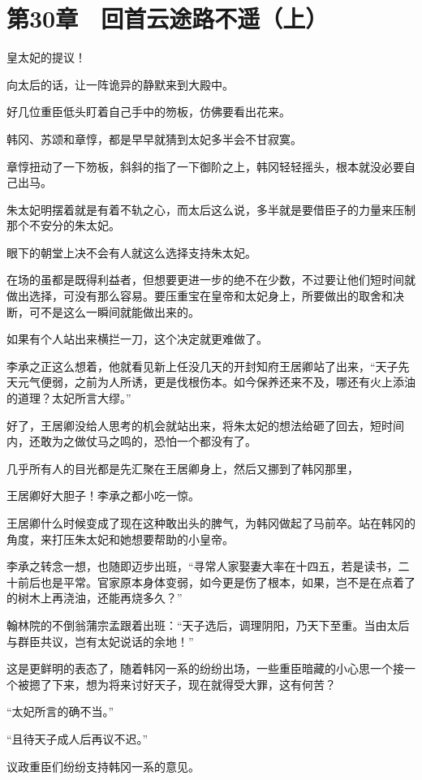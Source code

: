 \section{第30章　回首云途路不遥（上）}

皇太妃的提议！

向太后的话，让一阵诡异的静默来到大殿中。

好几位重臣低头盯着自己手中的笏板，仿佛要看出花来。

韩冈、苏颂和章惇，都是早早就猜到太妃多半会不甘寂寞。

章惇扭动了一下笏板，斜斜的指了一下御阶之上，韩冈轻轻摇头，根本就没必要自己出马。

朱太妃明摆着就是有着不轨之心，而太后这么说，多半就是要借臣子的力量来压制那个不安分的朱太妃。

眼下的朝堂上决不会有人就这么选择支持朱太妃。

在场的虽都是既得利益者，但想要更进一步的绝不在少数，不过要让他们短时间就做出选择，可没有那么容易。要压重宝在皇帝和太妃身上，所要做出的取舍和决断，可不是这么一瞬间就能做出来的。

如果有个人站出来横拦一刀，这个决定就更难做了。

李承之正这么想着，他就看见新上任没几天的开封知府王居卿站了出来，“天子先天元气便弱，之前为人所诱，更是伐根伤本。如今保养还来不及，哪还有火上添油的道理？太妃所言大缪。”

好了，王居卿没给人思考的机会就站出来，将朱太妃的想法给砸了回去，短时间内，还敢为之做仗马之鸣的，恐怕一个都没有了。

几乎所有人的目光都是先汇聚在王居卿身上，然后又挪到了韩冈那里，

王居卿好大胆子！李承之都小吃一惊。

王居卿什么时候变成了现在这种敢出头的脾气，为韩冈做起了马前卒。站在韩冈的角度，来打压朱太妃和她想要帮助的小皇帝。

李承之转念一想，也随即迈步出班，“寻常人家娶妻大率在十四五，若是读书，二十前后也是平常。官家原本身体变弱，如今更是伤了根本，如果，岂不是在点着了的树木上再浇油，还能再烧多久？”

翰林院的不倒翁蒲宗孟跟着出班：“天子选后，调理阴阳，乃天下至重。当由太后与群臣共议，岂有太妃说话的余地！”

这是更鲜明的表态了，随着韩冈一系的纷纷出场，一些重臣暗藏的小心思一个接一个被摁了下来，想为将来讨好天子，现在就得受大罪，这有何苦？

“太妃所言的确不当。”

“且待天子成人后再议不迟。”

议政重臣们纷纷支持韩冈一系的意见。

